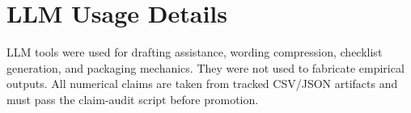 \section{LLM Usage Details}
\label{app:llm}

LLM tools were used for drafting assistance, wording compression, checklist generation, and packaging mechanics. They were not used to fabricate empirical outputs. All numerical claims are taken from tracked CSV/JSON artifacts and must pass the claim-audit script before promotion.
